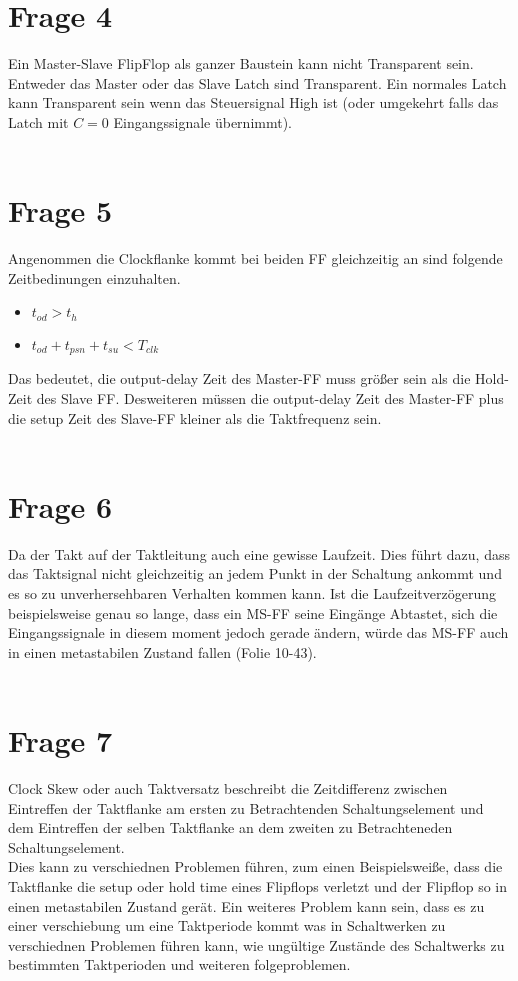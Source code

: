 \documentclass[a4paper]{scrartcl}
\begin{document}
\section*{Frage 4}
Ein Master-Slave FlipFlop als ganzer Baustein kann nicht Transparent sein. Entweder das Master oder das Slave Latch sind Transparent. Ein normales Latch kann Transparent sein wenn das Steuersignal High ist (oder umgekehrt falls das Latch mit $C=0$ Eingangssignale übernimmt).
~\\
~\\
\section*{Frage 5}
Angenommen die Clockflanke kommt bei beiden FF gleichzeitig an sind folgende Zeitbedinungen einzuhalten.\\
\begin{itemize}
	\item $t_{od} > t_{h}$
	\item $t_{od} + t_{psn} + t_{su} < T_{clk}$
\end{itemize}
Das bedeutet, die output-delay Zeit des Master-FF muss größer sein als die Hold-Zeit des Slave FF. Desweiteren müssen die output-delay Zeit des Master-FF plus die setup Zeit des Slave-FF kleiner als die Taktfrequenz sein.
~\\
~\\
\section*{Frage 6}
Da der Takt auf der Taktleitung auch eine gewisse Laufzeit. Dies führt dazu, dass das Taktsignal nicht gleichzeitig an jedem Punkt in der Schaltung ankommt und es so zu unverhersehbaren Verhalten kommen kann. Ist die Laufzeitverzögerung beispielsweise genau so lange, dass ein MS-FF seine Eingänge Abtastet, sich die Eingangssignale in diesem moment jedoch gerade ändern, würde das MS-FF auch in einen metastabilen Zustand fallen (Folie 10-43).
~\\
~\\
\section*{Frage 7}
Clock Skew oder auch Taktversatz beschreibt die Zeitdifferenz zwischen Eintreffen der Taktflanke am ersten zu Betrachtenden Schaltungselement und dem Eintreffen der selben Taktflanke an dem zweiten zu Betrachteneden Schaltungselement.\\
Dies kann zu verschiednen Problemen führen, zum einen Beispielsweiße, dass die Taktflanke die setup oder hold time eines Flipflops verletzt und der Flipflop so in einen metastabilen Zustand gerät. Ein weiteres Problem kann sein, dass es zu einer verschiebung um eine Taktperiode kommt was in Schaltwerken zu verschiednen Problemen führen kann, wie ungültige Zustände des Schaltwerks zu bestimmten Taktperioden und weiteren folgeproblemen.
~\\
~\\
\end{document}
